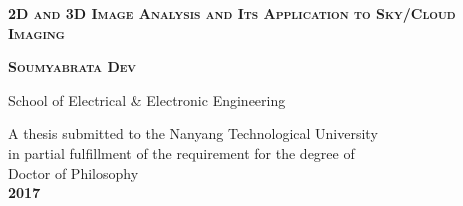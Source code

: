 \documentclass[reqno,12pt,oneside]{book} %
\begin{document}
\frontmatter
\pagestyle{plain}



\begin{titlepage}

\newcommand{\HRule}{\rule{\linewidth}{0.5mm}} %

\begin{center}
 






\textsc{{\Large \bfseries 2D and 3D Image Analysis and Its Application to Sky/Cloud Imaging}}\vspace{0.4cm} %

 
\vspace{4cm} 
 
\textsc{\Large \bfseries Soumyabrata Dev}\\[0.5cm]

\vspace{5cm} 

\vfill 

\large {School of Electrical \& Electronic Engineering}\\[0.5cm]

\vspace{1cm} 

\normalsize{A thesis submitted to the Nanyang Technological University\\ in partial fulfillment of the requirement for the degree of\\ 
Doctor of Philosophy}\\[0.3cm] %

 
{\large \textbf{2017}}\\[4cm] %
 

\end{center}
\end{titlepage}


\cleardoublepage








\clearpage

\pagestyle{fancy}
\fancyhf{}
\afterpage{\cfoot{\thepage}}    %

\cleardoublepage
{}
\tableofcontents
{}
\end{document}
